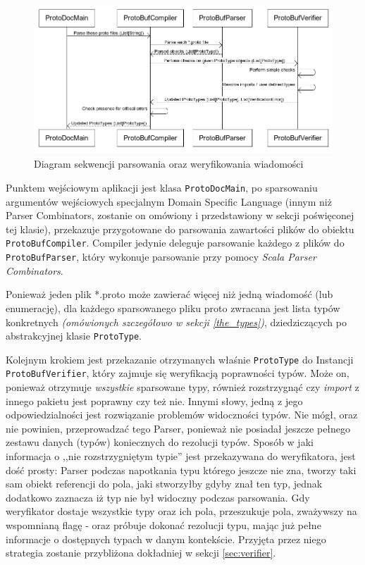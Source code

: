 \documentclass[pdflatex,11pt]{aghdpl}
\begin{document}
\begin{figure}[ch]
\begin{center}
 \includegraphics[width=\textwidth]{compile_sequence}
\end{center}
\caption{Diagram sekwencji parsowania oraz weryfikowania wiadomości}
\label{fig:sequence_diagram_parsing}
\end{figure}

Punktem wejściowym aplikacji jest klasa \verb|ProtoDocMain|, po sparsowaniu argumentów wejściowych specjalnym Domain Specific Language (innym niż
Parser Combinators, zostanie on omówiony i przedstawiony w sekcji poświęconej tej klasie), przekazuje przygotowane do parsowania zawartości plików
do obiektu \verb|ProtoBufCompiler|. Compiler jedynie deleguje parsowanie każdego z plików do \verb|ProtoBufParser|, który wykonuje parsowanie przy pomocy
\textit{Scala Parser Combinators}. 

Ponieważ jeden plik *.proto może zawierać więcej niż jedną wiadomość (lub enumerację), dla każdego sparsowanego
pliku proto zwracana jest lista typów konkretnych \textit{(omówionych szczegółowo w sekcji \ref{the_types})}, dziedziczących po abstrakcyjnej klasie \verb|ProtoType|. 

Kolejnym krokiem jest przekazanie otrzymanych właśnie \verb|ProtoType| do Instancji \verb|ProtoBufVerifier|, który zajmuje się weryfikacją poprawności typów.
Może on, ponieważ otrzymuje \textit{wszystkie} sparsowane typy, również rozstrzygnąć czy \textit{import} z innego pakietu jest poprawny czy też nie. 
Innymi słowy, jedną z jego odpowiedzialności jest rozwiązanie problemów widoczności typów. Nie mógł, oraz nie powinien, przeprowadzać tego Parser, ponieważ 
nie posiadał jeszcze pełnego zestawu danych (typów) koniecznych do rezolucji typów. Sposób w jaki informacja o ,,nie rozstrzygniętym typie'' jest przekazywana
do weryfikatora, jest dość prosty: Parser podczas napotkania typu którego jeszcze nie zna, tworzy taki sam obiekt referencji do pola, jaki stworzyłby gdyby
znał ten typ, jednak dodatkowo zaznacza iż typ nie był widoczny podczas parsowania. Gdy weryfikator dostaje wszystkie typy oraz ich pola, przeszukuje pola,
zważywszy na wspomnianą flagę - oraz próbuje dokonać rezolucji typu, mając już pełne informacje o dostępnych typach w danym kontekście. Przyjęta przez niego 
strategia zostanie przybliżona dokładniej w sekcji \ref{sec:verifier}.
\end{document}
